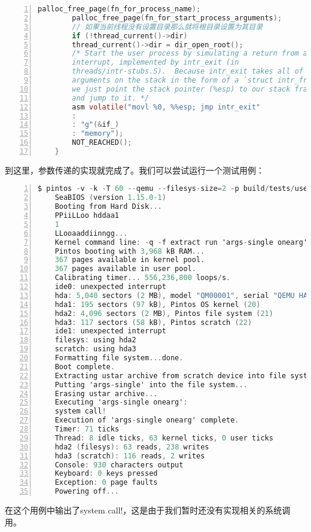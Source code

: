 \documentclass{article}
\begin{document}
\begin{lstlisting}[xleftmargin = 4em,xrightmargin = 4em, aboveskip = 1em, numbers = left, language = C,title=修改后的src/userprog/process.c - start\_process]
    	palloc_free_page(fn_for_process_name);
    	palloc_free_page(fn_for_start_process_arguments);
    	// 如果当前线程没有设置目录那么就将根目录设置为其目录
    	if (!thread_current()->dir)
    	thread_current()->dir = dir_open_root();
    	/* Start the user process by simulating a return from an
    	interrupt, implemented by intr_exit (in
    	threads/intr-stubs.S).  Because intr_exit takes all of its
    	arguments on the stack in the form of a `struct intr_frame',
    	we just point the stack pointer (%esp) to our stack frame
    	and jump to it. */
    	asm volatile("movl %0, %%esp; jmp intr_exit"
    	:
    	: "g"(&if_)
    	: "memory");
    	NOT_REACHED();
    }
	\end{lstlisting}
	
	到这里，参数传递的实现就完成了。我们可以尝试运行一个测试用例：
	
	
	\begin{lstlisting}[xleftmargin = 4em,xrightmargin = 4em, aboveskip = 1em, numbers = left, language = C,title=测试用例]
    $ pintos -v -k -T 60 --qemu --filesys-size=2 -p build/tests/userprog/args-none -a args-none -- -q -f run args-none
    SeaBIOS (version 1.15.0-1)
    Booting from Hard Disk...
    PPiiLLoo hddaa1
    1
    LLooaaddiinngg...
    Kernel command line: -q -f extract run 'args-single onearg'
    Pintos booting with 3,968 kB RAM...
    367 pages available in kernel pool.
    367 pages available in user pool.
    Calibrating timer... 556,236,800 loops/s.
    ide0: unexpected interrupt
    hda: 5,040 sectors (2 MB), model "QM00001", serial "QEMU HARDDISK"
    hda1: 195 sectors (97 kB), Pintos OS kernel (20)
    hda2: 4,096 sectors (2 MB), Pintos file system (21)
    hda3: 117 sectors (58 kB), Pintos scratch (22)
    ide1: unexpected interrupt
    filesys: using hda2
    scratch: using hda3
    Formatting file system...done.
    Boot complete.
    Extracting ustar archive from scratch device into file system...
    Putting 'args-single' into the file system...
    Erasing ustar archive...
    Executing 'args-single onearg':
    system call!
    Execution of 'args-single onearg' complete.
    Timer: 71 ticks
    Thread: 8 idle ticks, 63 kernel ticks, 0 user ticks
    hda2 (filesys): 63 reads, 238 writes
    hda3 (scratch): 116 reads, 2 writes
    Console: 930 characters output
    Keyboard: 0 keys pressed
    Exception: 0 page faults
    Powering off...
	\end{lstlisting}
	
	在这个用例中输出了system call!，这是由于我们暂时还没有实现相关的系统调用。
	
\end{document}
